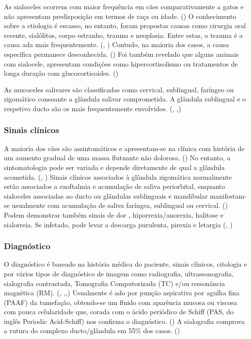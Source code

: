 As sialoceles ocorrem com maior frequência em cães comparativamente a gatos e não apresentam predisposição em termos de raça ou idade. (\cite{Bae2024}) O conhecimento sobre a etiologia é escasso, no entanto, foram propostas causas como cirurgia oral recente, sialólitos, corpo estranho, trauma e neoplasia. Entre estas, o trauma é a causa \cite{Kumar2017}ada mais frequentemente. (\cite{deLaPuerta2020}, \cite{Olimpo2023}) Contudo, na maioria dos casos, a causa específica permanece desconhecida. ({\cite{Cinti2021}}) Foi também revelado que alguns animais com sialocele, apresentam condições como hipercortisolismo ou tratamentos de longa duração com glucocorticoides. (\cite{Bae2024}) 


As mucoceles salivares são classificadas como cervical, sublingual, faríngeo ou zigomático consoante a glândula salivar comprometida. A glândula sublingual e o respetivo ducto são os mais frequentemente envolvidos. (\cite{Poirier2018}, \cite{Cinti2021},\cite{sa_})

\subsubsection{Sinais clínicos}

A maioria dos cães são assintomáticos e apresentam-se na clínica com história de um aumento gradual de uma massa flutuante não dolorosa. (\cite{Poirier2018}) No entanto, a sintomatologia pode ser variada e depende diretamente de qual a glândula acometida. (\cite{deLaPuerta2020}, \cite{sa_}) Sinais clínicos associados à glândula zigomática normalmente estão associados a exoftalmia e acumulação de saliva periorbital, enquanto sialoceles associadas  ao ducto ou glândulas sublinguais e mandibular manifestam-se usualmente com acumulação de saliva faríngea, sublingual ou cervical. (\cite{sa_}) Podem demonstrar também sinais de dor , hiporrexia/anorexia, halitose e sialorreia.  Se infetado, pode levar a descarga purulenta, pirexia e letargia (\cite{sa_}, \cite{Swieton2022})

\subsubsection{Diagnóstico}

O diagnóstico é baseado na história médica do paciente, sinais clínicos, citologia e por vários tipos de diagnóstico de imagem como radiografia, ultrassonografia, sialografia contrastada, Tomografia Computorizada (TC) e/ou ressonância magnética (RM). (\cite{Bae2024}, \cite{sa_},\cite{Olimpo2023},\cite{deLaPuerta2020}) Usualmente é \cite{Kumar2017}ado por punção aspirativa por agulha fina (PAAF) da tumefação, obtendo-se um fluido com aparência mucosa ou viscosa com pouca celularidade que, corada com o ácido periódico de Schiff (PAS, do inglês Periodic Acid-Schiff) nos confirma o diagnóstico. (\cite{Poirier2018}) A sialografia comprova  a rutura do complexo ducto/glândula em 55\% dos casos. (\cite{Olimpo2023}) 

